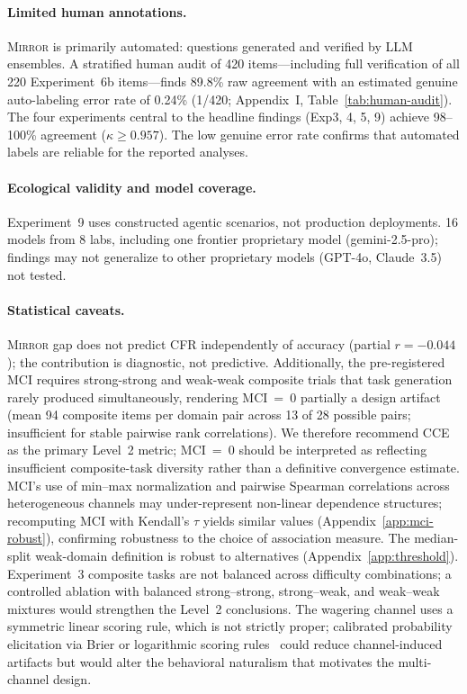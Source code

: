 \documentclass[10pt]{article}
\newcommand{\mirror}{\textsc{Mirror}}
\newcommand{\MCI}{MCI}
\newcommand{\CCE}{CCE}
\newcommand{\CFR}{CFR}
\begin{document}
\paragraph{Limited human annotations.}
\mirror{} is primarily automated: questions generated and verified by LLM ensembles. A stratified human audit of 420 items---including full verification of all 220 Experiment~6b items---finds 89.8\% raw agreement with an estimated genuine auto-labeling error rate of 0.24\% (1/420; Appendix~I, Table~\ref{tab:human-audit}). The four experiments central to the headline findings (Exp3, 4, 5, 9) achieve 98--100\% agreement ($\kappa \geq 0.957$). The low genuine error rate confirms that automated labels are reliable for the reported analyses.

\paragraph{Ecological validity and model coverage.}
Experiment~9 uses constructed agentic scenarios, not production deployments. 16 models from 8 labs, including one frontier proprietary model (gemini-2.5-pro); findings may not generalize to other proprietary models (GPT-4o, Claude~3.5) not tested.

\paragraph{Statistical caveats.}
\mirror{} gap does not predict \CFR{} independently of accuracy (partial $r = -0.044$); the contribution is diagnostic, not predictive. Additionally, the pre-registered \MCI{} requires strong-strong and weak-weak composite trials that task generation rarely produced simultaneously, rendering \MCI{}~=~0 partially a design artifact (mean 94 composite items per domain pair across 13 of 28 possible pairs; insufficient for stable pairwise rank correlations). We therefore recommend \CCE{} as the primary Level~2 metric; \MCI{}~=~0 should be interpreted as reflecting insufficient composite-task diversity rather than a definitive convergence estimate.
MCI's use of min--max normalization and pairwise Spearman correlations across
heterogeneous channels may under-represent non-linear dependence structures;
recomputing MCI with Kendall's $\tau$ yields similar values (Appendix~\ref{app:mci-robust}), confirming robustness to the choice of association measure.
The median-split weak-domain definition is robust to alternatives (Appendix~\ref{app:threshold}).
Experiment~3 composite tasks are not balanced across difficulty combinations;
a controlled ablation with balanced strong--strong, strong--weak, and weak--weak
mixtures would strengthen the Level~2 conclusions.
The wagering channel uses a symmetric linear scoring rule, which is not strictly
proper; calibrated probability elicitation via Brier or logarithmic scoring
rules~\citep{gneiting2007strictly} could reduce channel-induced artifacts but
would alter the behavioral naturalism that motivates the multi-channel design.
\end{document}
